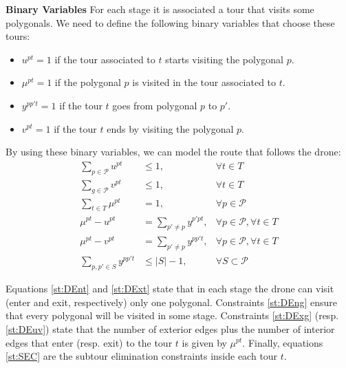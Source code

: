 \documentclass[10pt,a4paper]{article}
\newcommand{\LA}[1]{{\color{blue}#1}}
\begin{document}
\textbf{Binary Variables}
For each stage it is associated a tour that visits some polygonals. We need to define the following binary variables that choose these tours:
\begin{itemize}
  \item $u^{pt} = 1$ if the tour associated to $t$ starts visiting the polygonal $p$.
  \item $\mu^{pt} = 1$ if the polygonal $p$ is visited in the tour associated to $t$.
  \item $y^{{pp't}} = 1$ if the tour $t$ goes from polygonal $p$ to $p'$.
  \item $v^{pt} = 1$ if the tour $t$ ends by visiting the polygonal $p$.
\end{itemize}

By using these binary variables, we can model the route that follows the drone:
\begin{align}
    \sum_{p\in \mathcal P} u^{pt} & \leq 1, &\forall t\in T \label{st:DEnt}\\%
    \sum_{g\in\mathcal P} v^{pt} & \leq 1, &\forall t\in T \label{st:DExt}\\%
    \sum_{t\in T} \mu^{pt} & = 1, &\forall p\in\mathcal P \label{st:DEng}\\%
    \mu^{pt} -u^{pt} & = \sum_{p'\neq p} y^{{p'pt}}, &\forall p\in\mathcal P, \forall t\in T \label{st:DExg}\\%
    \mu^{pt} -v^{pt} & = \sum_{p'\neq p} y^{{pp't}}, &\forall p\in\mathcal P, \forall t\in T \label{st:DEuv}\\%
    \sum_{p, p'\in S} y^{{pp't}} & \leq |S| - 1, &\forall S\subset \mathcal P \label{st:SEC}
\end{align}

Equations \eqref{st:DEnt} and \eqref{st:DExt} state that in each stage the drone can visit (enter and exit, respectively) only one polygonal. Constraints \eqref{st:DEng} ensure that every polygonal will be visited in some stage. Constraints \eqref{st:DExg} (resp. \eqref{st:DEuv}) \LA{state} that the number of exterior edges plus the number of interior edges that enter (resp. exit) to the tour $t$ is given by $\mu^{pt}$. Finally, equations \eqref{st:SEC} are the subtour elimination constraints inside each tour $t$.
\end{document}
